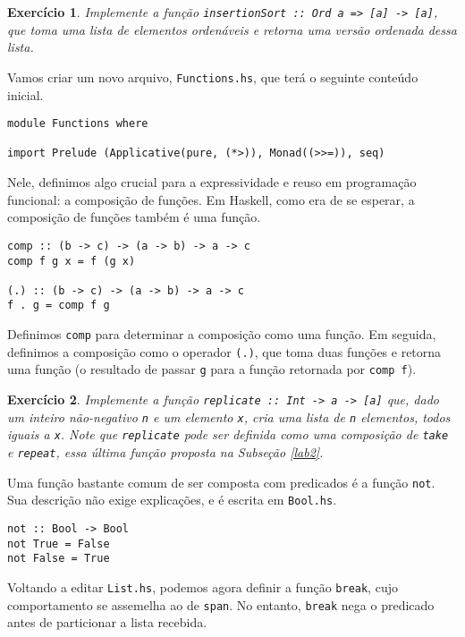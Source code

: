 \documentclass[a4paper]{article}
\newtheorem{exercicio}{Exercício}
\begin{document}
\begin{exercicio}
	Implemente a função \emph{\texttt{insertionSort :: Ord a => [a] -> [a]}}, que toma uma lista de elementos ordenáveis e retorna uma versão ordenada dessa lista.
\end{exercicio}

Vamos criar um novo arquivo, \texttt{Functions.hs}, que terá o seguinte conteúdo inicial.

\begin{verbatim}
module Functions where

import Prelude (Applicative(pure, (*>)), Monad((>>=)), seq)
\end{verbatim}

Nele, definimos algo crucial para a expressividade e reuso em programação funcional: a composição de funções.
Em Haskell, como era de se esperar, a composição de funções também é uma função.

\begin{verbatim}
comp :: (b -> c) -> (a -> b) -> a -> c
comp f g x = f (g x)

(.) :: (b -> c) -> (a -> b) -> a -> c
f . g = comp f g
\end{verbatim}

Definimos \texttt{comp} para determinar a composição como uma função.
Em seguida, definimos a composição como o operador \texttt{(.)}, que toma duas funções e retorna uma função (o resultado de passar \texttt{g} para a função retornada por \texttt{comp f}).

\begin{exercicio}
	Implemente a função \emph{\texttt{replicate :: Int -> a -> [a]}} que, dado um inteiro não-negativo \emph{\texttt{n}} e um elemento \emph{\texttt{x}}, cria uma lista de \emph{\texttt{n}} elementos, todos iguais a \emph{\texttt{x}}.
	Note que \emph{\texttt{replicate}} pode ser definida como uma composição de \emph{\texttt{take}} e \emph{\texttt{repeat}}, essa última função proposta na Subseção \ref{lab2}.
\end{exercicio}

Uma função bastante comum de ser composta com predicados é a função \texttt{not}.
Sua descrição não exige explicações, e é escrita em \texttt{Bool.hs}.

\begin{verbatim}
not :: Bool -> Bool
not True = False
not False = True
\end{verbatim}

Voltando a editar \texttt{List.hs}, podemos agora definir a função \texttt{break}, cujo comportamento se assemelha ao de \texttt{span}.
No entanto, \texttt{break} nega o predicado antes de particionar a lista recebida.
\end{document}
